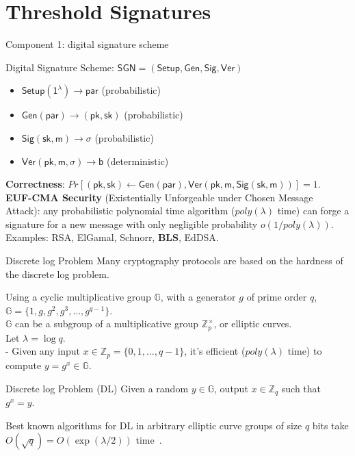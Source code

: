 
\section{Threshold Signatures}

\begin{frame}{Component 1: digital signature scheme}
\begin{block}{Digital Signature Scheme: $\mathsf{SGN} = \mathsf{(Setup, Gen, Sig, Ver)}$}
\begin{itemize}
\item $\mathsf{Setup(1^\lambda)\to par}$ (probabilistic)
\item $\mathsf{Gen(par)\to (pk, sk)}$ (probabilistic)
\item $\mathsf{Sig(sk,m)\to \sigma}$ (probabilistic)
\item $\mathsf{Ver(pk,m,\sigma)\to b}$ (deterministic)
\end{itemize}
\end{block}
\textbf{Correctness}: $Pr[(\mathsf{pk}, \mathsf{sk})\leftarrow \mathsf{Gen(par)}, \mathsf{Ver(pk, m, Sig(sk, m))}]=1$. \\
\textbf{EUF-CMA Security} (Existentially Unforgeable under Chosen Message Attack): any probabilistic polynomial time algorithm ($poly(\lambda)$ time) can forge a signature for a new message with only negligible probability $o(1/poly(\lambda))$. \\
\vspace{1em}
Examples: RSA, ElGamal, Schnorr, \textbf{BLS}, EdDSA. 
\end{frame}


\begin{frame}{Discrete log Problem}
Many cryptography protocols are based on the hardness of the discrete log problem. 
\vspace{0.5em}

Using a cyclic multiplicative group $\mathbb{G}$, with a generator $g$ of prime order $q$, $\mathbb{G} = \{1, g, g^2, g^3,\dots, g^{q-1}\}$. \\
$\mathbb{G}$ can be a subgroup of a multiplicative group $\mathbb{Z}_p^\times$, or elliptic curves. \\
\pause 
\vspace{0.4em}
Let $\lambda = \log q$. \\
- Given any input $x\in \mathbb{Z}_{p} =\{0,1,\dots, q-1\}$, it's efficient ($poly(\lambda)$ time) to compute $y=g^x\in \mathbb{G}$. 

\pause
\begin{block}{Discrete log Problem (DL)}
Given a random $y\in \mathbb{G}$, output $x\in \mathbb{Z}_q$ such that $g^x=y$. 
\end{block}

Best known algorithms for DL in arbitrary elliptic curve groups of size $q$ bits take $O(\sqrt{q}) = O(\exp(\lambda/2))$ time~. 
\end{frame}


